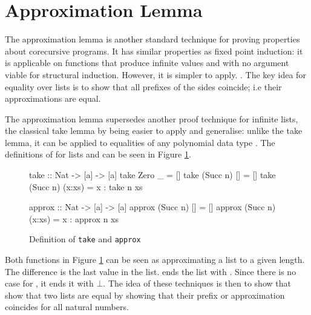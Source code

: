 \section{Approximation Lemma}
\label{sec:approx}

The approximation lemma is another standard technique for proving
properties about corecursive programs. It has similar properties as
fixed point induction: it is applicable on functions that produce
infinite values and with no argument viable for structural induction.
However, it is simpler to apply. \citep{corecursive}. The key idea for
equality over lists is to show that all prefixes of the sides
coincide; i.e their approximations are equal.

The approximation lemma supersedes another proof technique for
infinite lists, the classical take lemma \citep{introfp} by being
easier to apply and generalise: unlike the take lemma, it can be
applied to equalities of any polynomial data type
\citep{genapprox}. The definitions of  for lists and
 can be seen in Figure \ref{code:takeapprox}.

\begin{figure}[h!]
\centering
\begin{minipage}[b]{6.2cm}
\begin{code}
take :: Nat -> [a] -> [a]
take Zero     _      = []
take (Succ n) []     = []
take (Succ n) (x:xs) = x : take n xs
\end{code}
\end{minipage}
\hspace{10pt}
\begin{minipage}[b]{6.7cm}
\begin{code}
approx :: Nat -> [a] -> [a]
approx (Succ n) []     = []
approx (Succ n) (x:xs) = x : approx n xs
\end{code}
\end{minipage}
\caption{Definition of \texttt{take} and \texttt{approx}
\label{code:takeapprox}
}
\end{figure}

Both functions in Figure \ref{code:takeapprox} can be seen as
approximating a list to a given length. The difference is the last
value in the list.  ends the list with \hs{[]}. Since there
is no  case for , it ends it with $\bot$.  The
idea of these techniques is then to show that show that two lists are
equal by showing that their prefix or approximation coincides for all
natural numbers.

